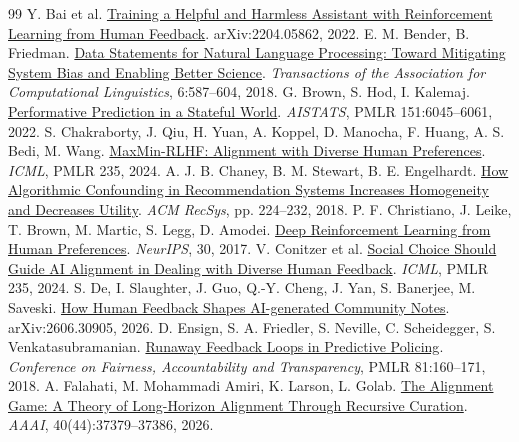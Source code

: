{\small
\begin{thebibliography}{99}
 Y. Bai et al. \href{https://arxiv.org/abs/2204.05862}{Training a Helpful and Harmless Assistant with Reinforcement Learning from Human Feedback}. arXiv:2204.05862, 2022.
 E. M. Bender, B. Friedman. \href{https://aclanthology.org/Q18-1041/}{Data Statements for Natural Language Processing: Toward Mitigating System Bias and Enabling Better Science}. \emph{Transactions of the Association for Computational Linguistics}, 6:587--604, 2018.
 G. Brown, S. Hod, I. Kalemaj. \href{https://proceedings.mlr.press/v151/brown22a.html}{Performative Prediction in a Stateful World}. \emph{AISTATS}, PMLR 151:6045--6061, 2022.
 S. Chakraborty, J. Qiu, H. Yuan, A. Koppel, D. Manocha, F. Huang, A. S. Bedi, M. Wang. \href{https://proceedings.mlr.press/v235/chakraborty24b.html}{MaxMin-RLHF: Alignment with Diverse Human Preferences}. \emph{ICML}, PMLR 235, 2024.
 A. J. B. Chaney, B. M. Stewart, B. E. Engelhardt. \href{https://doi.org/10.1145/3240323.3240370}{How Algorithmic Confounding in Recommendation Systems Increases Homogeneity and Decreases Utility}. \emph{ACM RecSys}, pp. 224--232, 2018.
 P. F. Christiano, J. Leike, T. Brown, M. Martic, S. Legg, D. Amodei. \href{https://proceedings.neurips.cc/paper_files/paper/2017/file/d5e2c0adad503c91f91df240d0cd4e49-Paper.pdf}{Deep Reinforcement Learning from Human Preferences}. \emph{NeurIPS}, 30, 2017.
 V. Conitzer et al. \href{https://arxiv.org/abs/2404.10271}{Social Choice Should Guide AI Alignment in Dealing with Diverse Human Feedback}. \emph{ICML}, PMLR 235, 2024.
 S. De, I. Slaughter, J. Guo, Q.-Y. Cheng, J. Yan, S. Banerjee, M. Saveski. \href{https://arxiv.org/abs/2606.30905}{How Human Feedback Shapes AI-generated Community Notes}. arXiv:2606.30905, 2026.
 D. Ensign, S. A. Friedler, S. Neville, C. Scheidegger, S. Venkatasubramanian. \href{https://proceedings.mlr.press/v81/ensign18a.html}{Runaway Feedback Loops in Predictive Policing}. \emph{Conference on Fairness, Accountability and Transparency}, PMLR 81:160--171, 2018.
 A. Falahati, M. Mohammadi Amiri, K. Larson, L. Golab. \href{https://doi.org/10.1609/aaai.v40i44.41070}{The Alignment Game: A Theory of Long-Horizon Alignment Through Recursive Curation}. \emph{AAAI}, 40(44):37379--37386, 2026.

\end{thebibliography}}
